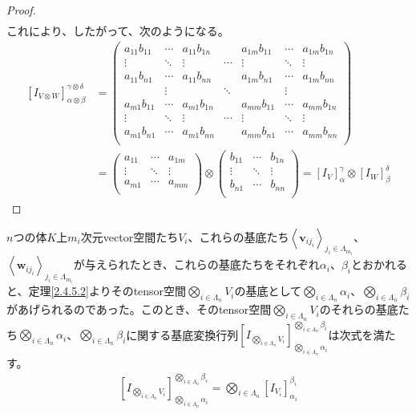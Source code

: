 \documentclass[dvipdfmx]{jsarticle}
\begin{document}
\begin{proof}
\begin{align*}
\end{align*}
これにより、したがって、次のようになる。
\begin{align*}
\left[ I_{V \otimes W} \right]^{\gamma \otimes \delta}_{\alpha \otimes \beta} &= \begin{pmatrix}
a_{11}b_{11} & \cdots & a_{11}b_{1n} & \  & a_{1m}b_{11} & \cdots & a_{1m}b_{1n} \\
 \vdots & \ddots & \vdots & \cdots & \vdots & \ddots & \vdots \\
a_{11}b_{n1} & \cdots & a_{11}b_{nn} & \  & a_{1m}b_{n1} & \cdots & a_{1m}b_{nn} \\
\  & \vdots & \  & \ddots & \  & \vdots & \  \\
a_{m1}b_{11} & \cdots & a_{m1}b_{1n} & \  & a_{mm}b_{11} & \cdots & a_{mm}b_{1n} \\
 \vdots & \ddots & \vdots & \cdots & \vdots & \ddots & \vdots \\
a_{m1}b_{n1} & \cdots & a_{m1}b_{nn} & \  & a_{mm}b_{n1} & \cdots & a_{mm}b_{nn} \\
\end{pmatrix}\\
&= \begin{pmatrix}
a_{11} & \cdots & a_{1m} \\
 \vdots & \ddots & \vdots \\
a_{m1} & \cdots & a_{mm} \\
\end{pmatrix} \otimes \begin{pmatrix}
b_{11} & \cdots & b_{1n} \\
 \vdots & \ddots & \vdots \\
b_{n1} & \cdots & b_{nn} \\
\end{pmatrix} = \left[ I_{V} \right]^{\gamma}_{\alpha} \otimes \left[ I_{W} \right]^{\delta}_{\beta}
\end{align*}
\end{proof}
\begin{thm}\label{2.4.7.3}
$n$つの体$K$上$m_{i}$次元vector空間たち$V_{i}$、これらの基底たち$\left\langle \mathbf{v}_{ij_{i}} \right\rangle_{j_{i} \in \varLambda_{m_{i}}}$、$\left\langle \mathbf{w}_{ij_{i}} \right\rangle_{j_{i} \in \varLambda_{m_{i}}}$が与えられたとき、これらの基底たちをそれぞれ$\alpha_{i}$、$\beta_{i}$とおかれると、定理\ref{2.4.5.2}よりそのtensor空間$\bigotimes_{i \in \varLambda_{n}} V_{i}$の基底として$\bigotimes_{i \in \varLambda_{n}} \alpha_{i}$、$\bigotimes_{i \in \varLambda_{n}} \beta_{i}$があげられるのであった。このとき、そのtensor空間$\bigotimes_{i \in \varLambda_{n}} V_{i}$のそれらの基底たち$\bigotimes_{i \in \varLambda_{n}} \alpha_{i}$、$\bigotimes_{i \in \varLambda_{n}} \beta_{i}$に関する基底変換行列$\left[ I_{\bigotimes_{i \in \varLambda_{n}} V_{i}} \right]^{\bigotimes_{i \in \varLambda_{n}} \beta_{i}}_{\bigotimes_{i \in \varLambda_{n}} \alpha_{i}}$は次式を満たす。
\begin{align*}
\left[ I_{\bigotimes_{i \in \varLambda_{n}} V_{i}} \right]^{\bigotimes_{i \in \varLambda_{n}} \beta_{i}}_{\bigotimes_{i \in \varLambda_{n}} \alpha_{i}} = \bigotimes_{i \in \varLambda_{n}} \left[ I_{V_{i}} \right]^{\beta_{i}}_{\alpha_{i}}
\end{align*}
\end{thm}
\end{document}

